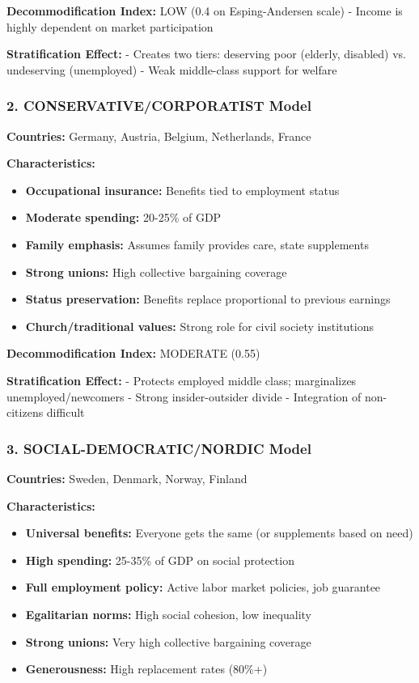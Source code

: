 \textbf{Decommodification Index:} LOW (0.4 on Esping-Andersen scale)
- Income is highly dependent on market participation

\textbf{Stratification Effect:}
- Creates two tiers: deserving poor (elderly, disabled) vs. undeserving (unemployed)
- Weak middle-class support for welfare

\subsubsection{2. CONSERVATIVE/CORPORATIST Model}

\textbf{Countries:} Germany, Austria, Belgium, Netherlands, France

\textbf{Characteristics:}
\begin{itemize}
\item \textbf{Occupational insurance:} Benefits tied to employment status
\item \textbf{Moderate spending:} 20-25\% of GDP
\item \textbf{Family emphasis:} Assumes family provides care, state supplements
\item \textbf{Strong unions:} High collective bargaining coverage
\item \textbf{Status preservation:} Benefits replace proportional to previous earnings
\item \textbf{Church/traditional values:} Strong role for civil society institutions
\end{itemize}

\textbf{Decommodification Index:} MODERATE (0.55)

\textbf{Stratification Effect:}
- Protects employed middle class; marginalizes unemployed/newcomers
- Strong insider-outsider divide
- Integration of non-citizens difficult

\subsubsection{3. SOCIAL-DEMOCRATIC/NORDIC Model}

\textbf{Countries:} Sweden, Denmark, Norway, Finland

\textbf{Characteristics:}
\begin{itemize}
\item \textbf{Universal benefits:} Everyone gets the same (or supplements based on need)
\item \textbf{High spending:} 25-35\% of GDP on social protection
\item \textbf{Full employment policy:} Active labor market policies, job guarantee
\item \textbf{Egalitarian norms:} High social cohesion, low inequality
\item \textbf{Strong unions:} Very high collective bargaining coverage
\item \textbf{Generousness:} High replacement rates (80\%+)
\end{itemize}

